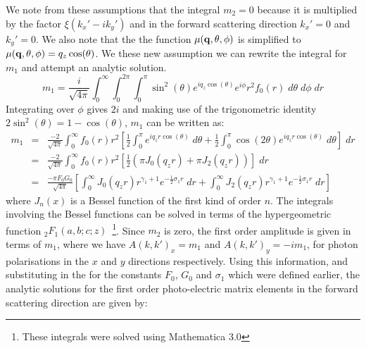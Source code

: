 We note from these assumptions that the integral $m_2 = 0$ because it is 
multiplied by the factor $\xi (k_x' - i k_y')$ and in the forward scattering
direction $k_x' = 0$ and $k_y' = 0$. We also note that the the function $\mu(\mathbf{q},\theta,\phi)$
is simplified to $\mu(\mathbf{q},\theta,\phi) = q_z \cos(\theta)$. We these new assumption we can 
rewrite the integral for $m_1$ and attempt an analytic solution.
\[
    m_1 = \frac{i}{\sqrt{4\pi}}
    \int_{0}^{\infty}
    \int_{0}^{2\pi}
    \int_{0}^{\pi}
        \sin^2(\theta) e^{iq_z \cos(\theta)} e^{i\phi} r^2 f_0(r) 
    \; d\theta
    \; d\phi
    \; dr
\]
Integrating over $\phi$ gives $2i$ and making use of the trigonometric
identity $2\sin^2(\theta) = 1-\cos(\theta)$, $m_1$ can be written as:
\begin{eqnarray*}
    m_1 & = & \frac{-2}{\sqrt{4\pi}}
    \int_0^\infty
        f_0(r) r^2
        \left[
            \frac{1}{2} 
            \int_0^\pi
                e^{i q_z r \cos(\theta) }
            \; d\theta
            +
            \frac{1}{2}
            \int_0^\pi
                \cos(2\theta) e^{i q_z r \cos(\theta) }
            \; d\theta
        \right]
    \; dr 
    \\
    & = &
    \frac{-2}{\sqrt{4\pi}}
    \int_0^\infty
    f_0(r) r^2
    \left[
        \frac{1}{2} ( \pi J_0(q_z r)  +  \pi J_2(q_z r) )
    \right]
    \; dr
    \\
    & = &
    \frac{-\pi F_0 G_0}{\sqrt{4\pi}}
    \left[
        \int_0^\infty
            J_0(q_z r) r^{\gamma_1 + 1} e^{-\frac{1}{2} \sigma_1 r}
        \; dr
        +
        \int_0^\infty
            J_2(q_z r) r^{\gamma_1 + 1} e^{-\frac{1}{2} \sigma_1 r}
        \; dr
    \right]
\end{eqnarray*}
where $J_n(x)$ is a Bessel function of the first kind of order $n$.
The integrals involving the Bessel functions can be solved in terms of the
hypergeometric function $_2 F_1(a,b;c;z)$~\footnote{These integrals were solved
using Mathematica 3.0}. Since $m_2$ is zero, the first order amplitude is given
in terms of $m_1$, where we have $A(k,k')_x = m_1$ and $A(k,k')_y = -i m_1$, for
photon polarisations in the $x$ and $y$ directions respectively. 
Using this information, and substituting in the for the constants $F_0$, 
$G_0$ and $\sigma_1$ which were defined earlier, the analytic solutions
for the first order photo-electric matrix elements in the forward scattering
direction are given by:
